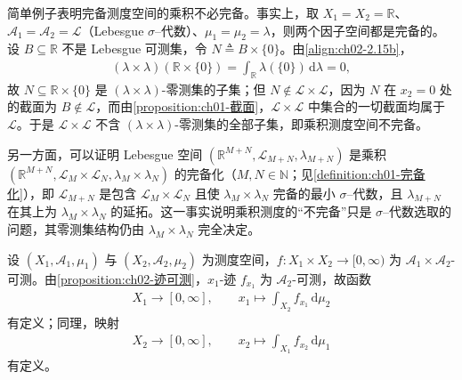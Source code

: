 \documentclass[../../main.tex]{subfiles}%
\begin{document}
\begin{remark}\label{remark:ch02-乘积完备化}
简单例子表明完备测度空间的乘积不必完备。事实上，取 $X_1=X_2=\mathbb R$、$\mathscr A_1=\mathscr A_2=\mathscr L$（Lebesgue $\sigma$--代数）、$\mu_1=\mu_2=\lambda$，则两个因子空间都是完备的。设 $B\subseteq\mathbb R$ 不是 Lebesgue 可测集，令 $N\triangleq B\times\{0\}$。由\eqref{align:ch02-2.15b}，
\begin{align*}
(\lambda\times\lambda)(\mathbb R\times\{0\})=\int_{\mathbb R}\lambda(\{0\})\,\mathrm{d}\lambda=0,
\end{align*}
故 $N\subseteq\mathbb R\times\{0\}$ 是 $(\lambda\times\lambda)$-零测集的子集；但 $N\notin\mathscr L\times\mathscr L$，因为 $N$ 在 $x_2=0$ 处的截面为 $B\notin\mathscr L$，而由\cref{proposition:ch01-截面}，$\mathscr L\times\mathscr L$ 中集合的一切截面均属于 $\mathscr L$。于是 $\mathscr L\times\mathscr L$ 不含 $(\lambda\times\lambda)$-零测集的全部子集，即乘积测度空间不完备。

另一方面，可以证明 Lebesgue 空间 $(\mathbb R^{M+N},\mathscr L_{M+N},\lambda_{M+N})$ 是乘积 $(\mathbb R^{M+N},\mathscr L_M\times\mathscr L_N,\lambda_M\times\lambda_N)$ 的完备化（$M,N\in\mathbb N$；见\cref{definition:ch01-完备化}），即 $\mathscr L_{M+N}$ 是包含 $\mathscr L_M\times\mathscr L_N$ 且使 $\lambda_M\times\lambda_N$ 完备的最小 $\sigma$--代数，且 $\lambda_{M+N}$ 在其上为 $\lambda_M\times\lambda_N$ 的延拓。这一事实说明乘积测度的“不完备”只是 $\sigma$--代数选取的问题，其零测集结构仍由 $\lambda_M\times\lambda_N$ 完全决定。
\end{remark}

设 $(X_1,\mathscr A_1,\mu_1)$ 与 $(X_2,\mathscr A_2,\mu_2)$ 为测度空间，$f:X_1\times X_2\to[0,\infty)$ 为 $\mathscr A_1\times\mathscr A_2$-可测。由\cref{proposition:ch02-迹可测}，$x_1$-迹 $f_{x_1}$ 为 $\mathscr A_2$-可测，故函数
\begin{align}
X_1\to[0,\infty],\qquad x_1\mapsto\int_{X_2}f_{x_1}\,\mathrm{d}\mu_2 \label{align:ch02-2.16a}
\end{align}
有定义；同理，映射
\begin{align}
X_2\to[0,\infty],\qquad x_2\mapsto\int_{X_1}f_{x_2}\,\mathrm{d}\mu_1 \label{align:ch02-2.16b}
\end{align}
有定义。
\end{document}
